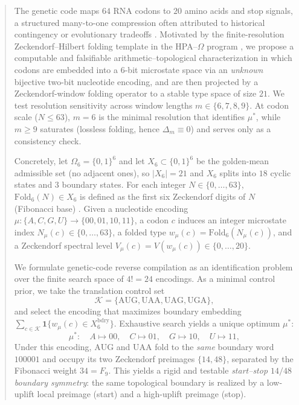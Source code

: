 \begin{abstract}
The genetic code maps $64$ RNA codons to $20$ amino acids and stop signals, a structured many-to-one compression often attributed to historical contingency or evolutionary tradeoffs \cite{Crick1968,Wong1975,HaigHurst1991}. Motivated by the finite-resolution \texorpdfstring{Zeckendorf--Hilbert}{Zeckendorf--Hilbert} folding template in the HPA--$\Omega$ program \cite{Ma2025RF}, we propose a computable and falsifiable arithmetic--topological characterization in which codons are embedded into a $6$-bit microstate space via an \emph{unknown} bijective two-bit nucleotide encoding, and are then projected by a Zeckendorf-window folding operator to a stable type space of size $21$. We test resolution sensitivity across window lengths $m\in\{6,7,8,9\}$. At codon scale ($N\le 63$), $m=6$ is the minimal resolution that identifies $\mu^\ast$, while $m\ge 9$ saturates (lossless folding, hence $\Delta_m\equiv 0$) and serves only as a consistency check.

Concretely, let $\Omega_6=\{0,1\}^6$ and let $X_6\subset\{0,1\}^6$ be the golden-mean admissible set (no adjacent ones), so $|X_6|=21$ and $X_6$ splits into $18$ cyclic states and $3$ boundary states. For each integer $N\in\{0,\dots,63\}$, $\mathrm{Fold}_6(N)\in X_6$ is defined as the first six Zeckendorf digits of $N$ (Fibonacci base) \cite{Zeckendorf1972}. Given a nucleotide encoding $\mu:\{A,C,G,U\}\to\{00,01,10,11\}$, a codon $c$ induces an integer microstate index $N_\mu(c)\in\{0,\dots,63\}$, a folded type $w_\mu(c)=\mathrm{Fold}_6(N_\mu(c))$, and a Zeckendorf spectral level $V_\mu(c)=V(w_\mu(c))\in\{0,\dots,20\}$.

We formulate genetic-code reverse compilation as an identification problem over the finite search space of $4!=24$ encodings. As a minimal control prior, we take the translation control set
\[
\mathcal{K}=\{\mathrm{AUG},\mathrm{UAA},\mathrm{UAG},\mathrm{UGA}\},
\]
and select the encoding that maximizes boundary embedding $\sum_{c\in\mathcal{K}}\mathbf{1}\{w_\mu(c)\in X_6^{\mathrm{bdry}}\}$. Exhaustive search yields a unique optimum $\mu^\ast$:
\[
\mu^\ast:\quad A\mapsto 00,\quad C\mapsto 01,\quad G\mapsto 10,\quad U\mapsto 11,
\]
Under this encoding, $\mathrm{AUG}$ and $\mathrm{UAA}$ fold to the \emph{same} boundary word $100001$ and occupy its two Zeckendorf preimages $\{14,48\}$, separated by the Fibonacci weight $34=F_9$. This yields a rigid and testable \emph{start--stop $14/48$ boundary symmetry}: the same topological boundary is realized by a low-uplift local preimage (start) and a high-uplift preimage (stop).


\end{abstract}
